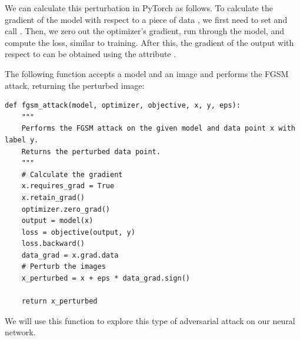 We can calculate this perturbation in PyTorch as follows.
To calculate the gradient of the model with respect to a piece of data , we first need to set  and call . %
Then, we zero out the optimizer's gradient, run  through the model, and compute the loss, similar to training.
After this, the gradient of the output with respect to  can be obtained using the attribute .

The following function  accepts a model and an image and performs the FGSM attack, returning the perturbed image:
\newpage
\begin{lstlisting}[belowskip=-0.8 \baselineskip]
def fgsm_attack(model, optimizer, objective, x, y, eps):
    """
    Performs the FGSM attack on the given model and data point x with label y.
    Returns the perturbed data point.
    """
    # Calculate the gradient
    x.requires_grad = True
    x.retain_grad()
    optimizer.zero_grad()
    output = model(x)
    loss = objective(output, y)
    loss.backward()
    data_grad = x.grad.data
    # Perturb the images
    x_perturbed = x + eps * data_grad.sign()
    
    return x_perturbed
\end{lstlisting}
We will use this function to explore this type of adversarial attack on our neural network.
